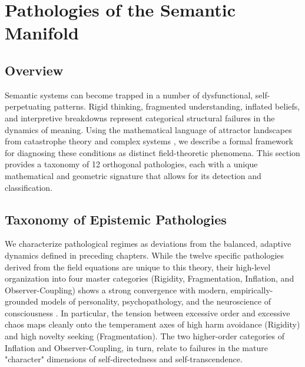 \chapter{Pathologies of the Semantic Manifold}
\label{16:pathologies_of_the_semantic_manifold}


\section{Overview}
\label{16.1:overview}

Semantic systems can become trapped in a number of dysfunctional, self-perpetuating patterns. Rigid thinking, fragmented understanding, inflated beliefs, and interpretive breakdowns represent categorical structural failures in the dynamics of meaning. Using the mathematical language of attractor landscapes from catastrophe theory and complex systems \autocite{Thom1975, Zeeman1977, Milnor1985}, we describe a formal framework for diagnosing these conditions as distinct field-theoretic phenomena. This section provides a taxonomy of 12 orthogonal pathologies, each with a unique mathematical and geometric signature that allows for its detection and classification.


\section{Taxonomy of Epistemic Pathologies}
\label{16.2:taxonomy_of_epistemic_pathologies}

We characterize pathological regimes as deviations from the balanced, adaptive dynamics defined in preceding chapters. While the twelve specific pathologies derived from the field equations are unique to this theory, their high-level organization into four master categories (Rigidity, Fragmentation, Inflation, and Observer-Coupling) shows a strong convergence with modern, empirically-grounded models of personality, psychopathology, and the neuroscience of consciousness \autocite{Cloninger1993, Dehaene2014}. In particular, the tension between excessive order and excessive chaos maps cleanly onto the temperament axes of high harm avoidance (Rigidity) and high novelty seeking (Fragmentation). The two higher-order categories of Inflation and Observer-Coupling, in turn, relate to failures in the mature "character" dimensions of self-directedness and self-transcendence. 

